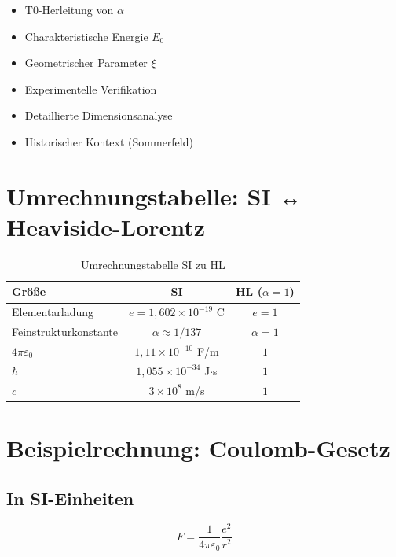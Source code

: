 	\begin{itemize}
		\item T0-Herleitung von $\alpha$
		\item Charakteristische Energie $E_0$
		\item Geometrischer Parameter $\xi$
		\item Experimentelle Verifikation
		\item Detaillierte Dimensionsanalyse
		\item Historischer Kontext (Sommerfeld)
	\end{itemize}
	
	\appendix
	
	\section{Umrechnungstabelle: SI ↔ Heaviside-Lorentz}
	
	\begin{table}[h]
		\centering
		\begin{tabular}{|l|c|c|}
			\hline
			\textbf{Größe} & \textbf{SI} & \textbf{HL ($\alpha = 1$)} \\
			\hline
			Elementarladung & $e = 1{,}602 \times 10^{-19}$ C & $e = 1$ \\
			Feinstrukturkonstante & $\alpha \approx 1/137$ & $\alpha = 1$ \\
			$4\pi\varepsilon_0$ & $1{,}11 \times 10^{-10}$ F/m & $1$ \\
			$\hbar$ & $1{,}055 \times 10^{-34}$ J$\cdot$s & $1$ \\
			$c$ & $3 \times 10^8$ m/s & $1$ \\
			\hline
		\end{tabular}
		\caption{Umrechnungstabelle SI zu HL}
	\end{table}
	
	\section{Beispielrechnung: Coulomb-Gesetz}
	
	\subsection{In SI-Einheiten}
	
	\begin{equation}
		F = \frac{1}{4\pi\varepsilon_0} \frac{e^2}{r^2}
	\end{equation}
	
